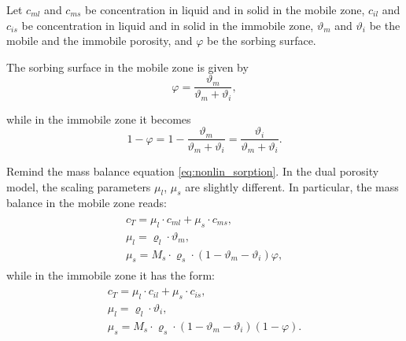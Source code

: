Let $c_{ml}$ and $c_{ms}$ be concentration in liquid and in solid in the mobile zone, 
$c_{il}$ and $c_{is}$ be concentration in liquid and in solid in the immobile zone,
$\vartheta_m$ and $\vartheta_i$ be the mobile and the immobile porosity,
and $\varphi$ be the sorbing surface.

The sorbing surface in the mobile zone is given by
\begin{equation}
  \varphi = \frac{\vartheta_m}{\vartheta_m + \vartheta_i}, 
\end{equation}

while in the immobile zone it becomes
\[ 1 - \varphi = 1-\frac{\vartheta_m}{\vartheta_m + \vartheta_i} = \frac{\vartheta_i}{\vartheta_m + \vartheta_i}. \]

Remind the mass balance equation \eqref{eq:nonlin_sorption}.
In the dual porosity model, the scaling parameters $\mu_l$, $\mu_s$ are slightly different.
In particular, the mass balance in the mobile zone reads:
\begin{eqnarray}
 \begin{array}{l}
  c_T = \mu_l\cdot c_{ml} + \mu_s\cdot c_{ms},\\
  \mu_l = \varrho_l \cdot \vartheta_m, \\
  \mu_s = M_s \cdot\varrho_s\cdot(1-\vartheta_m - \vartheta_i)\varphi,
 \end{array}
 \label{eq:scale_params_m}
\end{eqnarray}
while in the immobile zone it has the form:
\begin{eqnarray}
 \begin{array}{l}
  c_T = \mu_l\cdot c_{il} + \mu_s\cdot c_{is},\\
  \mu_l = \varrho_l \cdot \vartheta_i, \\
  \mu_s = M_s \cdot\varrho_s\cdot(1-\vartheta_m - \vartheta_i)(1 - \varphi).
 \end{array}
 \label{eq:scale_params_i}
\end{eqnarray}
